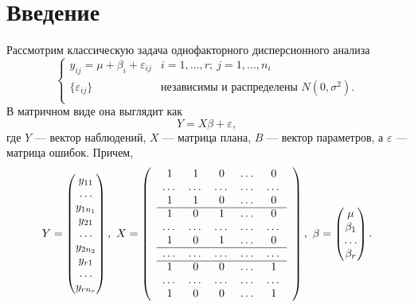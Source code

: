 \documentclass{spisok-article}
\theoremstyle{definition}
\begin{document}
\section{Введение}
Рассмотрим классическую задача однофакторного дисперсионного анализа \cite{sheffe}
\[
\begin{cases}
y_{ij} = \mu + \beta_i + \varepsilon_{ij} & i = 1, \dots , r;\ j = 1, \dots , n_i \\
\{\varepsilon_{ij}\} &  \text{независимы и распределены } N(0, \sigma^2). \\
\end{cases}
\]
В матричном виде она выглядит как 
\begin{equation} \label{main_v}
Y = X\beta + \varepsilon,
\end{equation}
где $Y$ --- вектор наблюдений, $X$ --- матрица плана, $B$ --- вектор параметров, а $\varepsilon$ --- матрица ошибок. Причем,
\[Y = 
\begin{pmatrix}
y_{11} \\ \dots \\ y_{1n_1} \\ y_{21} \\ \dots \\ y_{2n_2} \\ y_{r1} \\ \dots \\ y_{rn_r}
\end{pmatrix},\ 
X = \begin{pmatrix}
&1 & 1 & 0 & \dots & 0 &\\
&\dots & \dots & \dots & \dots & \dots &\\
&1 & 1 & 0 & \dots & 0 &\\
\cline{2-6}
&1 & 0 & 1 & \dots & 0 &\\
&\dots & \dots & \dots & \dots & \dots &\\
&1 & 0 & 1 & \dots & 0 &\\
\cline{2-6}
&\dots & \dots & \dots & \dots & \dots &\\
\cline{2-6}
&1 & 0 & 0 & \dots & 1 &\\
&\dots & \dots & \dots & \dots & \dots &\\
&1 & 0 & 0 & \dots & 1 &\\
\end{pmatrix}, \ 
\beta = \begin{pmatrix}
\mu \\ \beta_1 \\ \dots \\ \beta_r
\end{pmatrix}.
\] 
\end{document}
